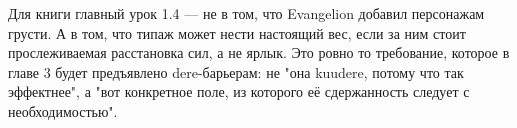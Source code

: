 Для книги главный урок 1.4 — не в том, что Evangelion добавил персонажам грусти. А в том, что типаж может нести настоящий вес, если за ним стоит прослеживаемая расстановка сил, а не ярлык. Это ровно то требование, которое в главе 3 будет предъявлено dere-барьерам: не "она kuudere, потому что так эффектнее", а "вот конкретное поле, из которого её сдержанность следует с необходимостью".
